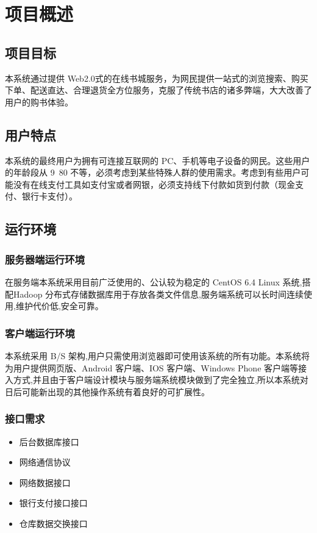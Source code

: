 \chapter{项目概述}
\section{项目目标}
本系统通过提供 Web2.0式的在线书城服务，为网民提供一站式的浏览搜索、购买下单、配送直达、合理退货全方位服务，克服了传统书店的诸多弊端，大大改善了用户的购书体验。
\section{用户特点}
本系统的最终用户为拥有可连接互联网的 PC、手机等电子设备的网民。这些用户的年龄段从 9~80 不等，必须考虑到某些特殊人群的使用需求。考虑到有些用户可能没有在线支付工具如支付宝或者网银，必须支持线下付款如货到付款（现金支付、银行卡支付）。
\section{运行环境}
\subsection{服务器端运行环境}
在服务端本系统采用目前广泛使用的、公认较为稳定的 CentOS 6.4 Linux 系统,搭配Hadoop 分布式存储数据库用于存放各类文件信息,服务端系统可以长时间连续使用,维护代价低,安全可靠。
\subsection{客户端运行环境}
本系统采用 B/S 架构,用户只需使用浏览器即可使用该系统的所有功能。本系统将为用户提供网页版、Android 客户端、IOS 客户端、Windows Phone 客户端等接入方式,并且由于客户端设计模块与服务端系统模块做到了完全独立,所以本系统对日后可能新出现的其他操作系统有着良好的可扩展性。
\subsection{接口需求}
\begin{itemize}
	\item 后台数据库接口
	\item 网络通信协议
	\item 网络数据接口
	\item 银行支付接口接口
	\item 仓库数据交换接口 
\end{itemize}